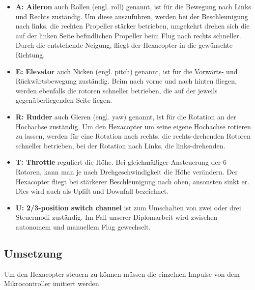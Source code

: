       \begin{itemize}
        \item \textbf{A: Aileron} auch Rollen (engl. roll) genannt, ist für die Bewegung nach Links und Rechts zuständig.
        Um diese auszuführen, werden bei der Beschleunigung nach links, die rechten Propeller stärker betrieben, umgekehrt drehen sich die auf der linken Seite befindlichen Propeller beim Flug nach rechts schneller. Durch die entstehende Neigung, fliegt der Hexacopter in die gewünschte Richtung.
        \item \textbf{E: Elevator} auch Nicken (engl. pitch) genannt, ist für die Vorwärts- und Rückwärtsbewegung zuständig.
        Beim nach vorne und nach hinten fliegen, werden ebenfalls die rotoren schneller betrieben, die auf der jeweils gegenüberliegenden Seite liegen.
        \item \textbf{R: Rudder} auch Gieren (engl. yaw) genannt, ist für die Rotation an der Hochachse zuständig.
        Um den Hexacopter um seine eigene Hochachse rotieren zu lassen, werden für eine Rotation nach rechts, die rechts-drehenden Rotoren schneller betrieben, bei der Rotation nach Links, die links-drehenden.
        \item \textbf{T: Throttle} reguliert die Höhe.
        Bei gleichmäßiger Ansteuerung der 6 Rotoren, kann man je nach Drehgeschwindigkeit die Höhe verändern. Der Hexacopter fliegt bei stärkerer Beschleunigung nach oben, ansonsten sinkt er. Dies wird auch als Uplift and Downfall bezeichnet.
        \item \textbf{U: 2/3-position switch channel} ist zum Umschalten von zwei oder drei Steuermodi zuständig. Im Fall unserer Diplomarbeit wird zwischen autonomem und manuellem Flug gewechselt. \cite{positionswitch}
      \end{itemize}


  \subsection{Umsetzung}
  Um den Hexacopter steuern zu können müssen die einzelnen Impulse von dem Mikrocontroller imitiert werden.
